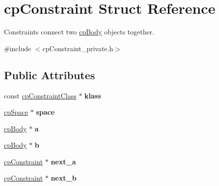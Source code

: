 \hypertarget{structcp_constraint}{}\section{cp\+Constraint Struct Reference}
\label{structcp_constraint}


Constraints connect two \hyperlink{structcp_body}{cp\+Body} objects together.  




{\ttfamily \#include $<$cp\+Constraint\+\_\+private.\+h$>$}

\subsection*{Public Attributes}
\begin{DoxyCompactItemize}
\item 
\hypertarget{structcp_constraint_af34bbdbca29e0661efb022f106080301}{}const \hyperlink{structcp_constraint_class}{cp\+Constraint\+Class} $\ast$ {\bfseries klass}\label{structcp_constraint_af34bbdbca29e0661efb022f106080301}

\item 
\hypertarget{structcp_constraint_ad0210f420d9ba931e614e02fa16a6d29}{}\hyperlink{structcp_space}{cp\+Space} $\ast$ {\bfseries space}\label{structcp_constraint_ad0210f420d9ba931e614e02fa16a6d29}

\item 
\hypertarget{structcp_constraint_a5740b2723545d943c2f45263e27fb9dd}{}\hyperlink{structcp_body}{cp\+Body} $\ast$ {\bfseries a}\label{structcp_constraint_a5740b2723545d943c2f45263e27fb9dd}

\item 
\hypertarget{structcp_constraint_a6535c08469cbed91a28ae36aa2e40f89}{}\hyperlink{structcp_body}{cp\+Body} $\ast$ {\bfseries b}\label{structcp_constraint_a6535c08469cbed91a28ae36aa2e40f89}

\item 
\hypertarget{structcp_constraint_a1cfdb09c3bd7645d8d1b988bd08f3e31}{}\hyperlink{structcp_constraint}{cp\+Constraint} $\ast$ {\bfseries next\+\_\+a}\label{structcp_constraint_a1cfdb09c3bd7645d8d1b988bd08f3e31}

\item 
\hypertarget{structcp_constraint_a85b2d9ffa8c01b1d9800c87cd04bcee3}{}\hyperlink{structcp_constraint}{cp\+Constraint} $\ast$ {\bfseries next\+\_\+b}\label{structcp_constraint_a85b2d9ffa8c01b1d9800c87cd04bcee3}


\end{DoxyCompactItemize}
